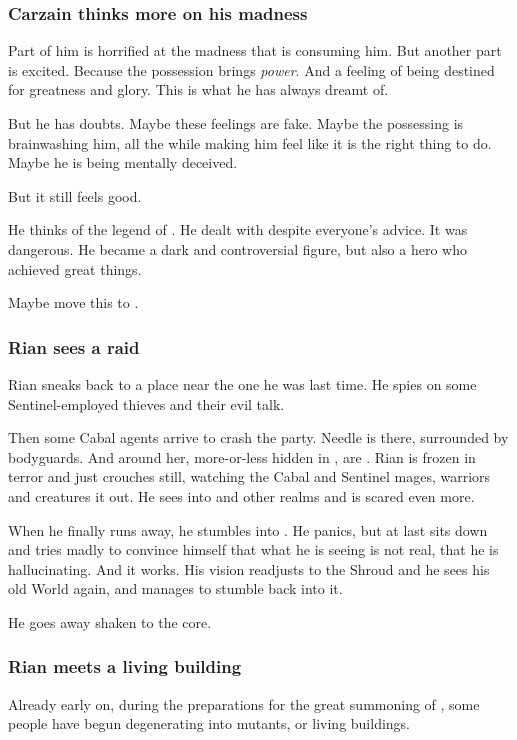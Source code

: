 \subsubsection{Carzain thinks more on his madness}
Part of him is horrified at the madness that is consuming him. 
But another part is excited. 
Because the possession brings \emph{power}. 
And a feeling of being destined for greatness and glory. 
This is what he has always dreamt of. 

But he has doubts. 
Maybe these feelings are fake. 
Maybe the possessing \Archon{} is brainwashing him, all the while making him feel like it is the right thing to do. 
Maybe he is being mentally deceived. 

But it still feels good. 

He thinks of the legend of . 
He dealt with \qliphoth{} despite everyone's advice. 
It was dangerous. 
He became a dark and controversial figure, but also a hero who achieved great things. 

Maybe move this to . 





\subsubsection{Rian sees a raid}
Rian sneaks back to a place near the one he was last time. 
He spies on some Sentinel-employed thieves and their evil talk. 

Then some Cabal agents arrive to crash the party. 
Needle is there, surrounded by bodyguards. 
And around her, more-or-less hidden in \Nyx, are \banerats{}. 
Rian is frozen in terror and just crouches still, watching the Cabal and Sentinel mages, warriors and creatures \rayuth it out. 
He sees into \Nyx{} and other realms and is scared even more. 


When he finally runs away, he stumbles into \Nyx. 
He panics, but at last sits down and tries madly to convince himself that what he is seeing is not real, that he is hallucinating. 
And it works. 
His vision readjusts to the Shroud and he sees his old World again, and manages to stumble back into it. 

He goes away shaken to the core. 





\subsubsection{Rian meets a living building}
Already early on, during the preparations for the great summoning of \Nithd{}, some people have begun degenerating into mutants, or living buildings. 

